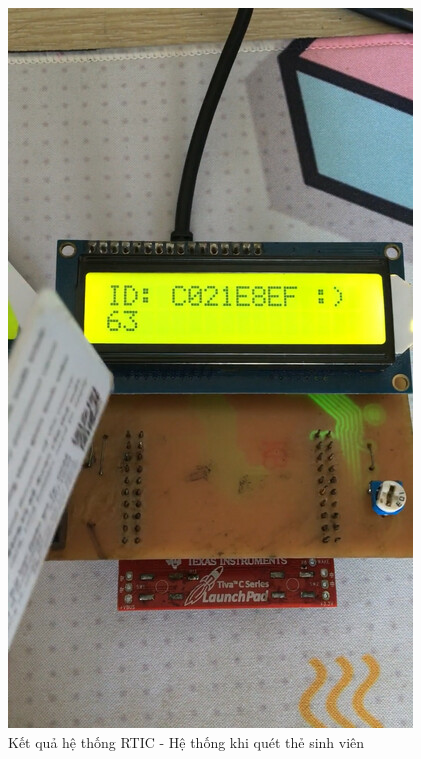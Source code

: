 \begin{figure}[ht]
\centering
\includegraphics[scale=0.4]{images/rtic_student.jpg}
\caption{Kết quả hệ thống RTIC - Hệ thống khi quét thẻ sinh viên}
\label{fig:rtic_student}
\end{figure}

